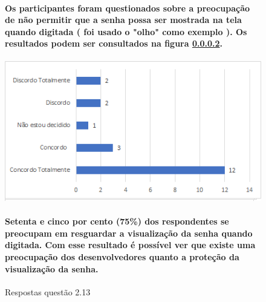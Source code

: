 \begin{figure}[!t]
\centering
\paragraph{Os participantes foram questionados sobre a preocupação de não permitir que a senha possa ser mostrada na tela quando digitada ( foi usado o "olho" como exemplo ). Os resultados podem ser consultados na figura \ref{fig:2.13}. 
}
\includegraphics[scale=0.7]{figuras das questoes/2.13.png}
\caption{Respostas questão 2.13}

\paragraph{
Setenta e cinco por cento (75{\%}) dos respondentes se preocupam em resguardar a visualização da senha quando digitada.  Com esse resultado é possível  ver que existe uma preocupação dos desenvolvedores quanto a proteção da visualização da senha.
}

\label{fig:2.13}
\end{figure}

